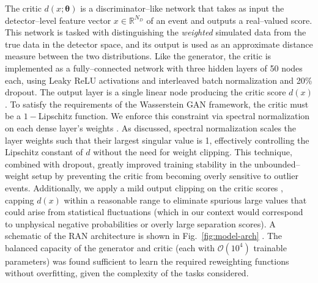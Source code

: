 {{        The critic $d(x;\boldsymbol{\theta})$ is a discriminator--like network that takes as input the {detector--level} feature vector $x \in \mathbb{R}^{N_D}$ of an event and outputs a real--valued score.
        This network is tasked with distinguishing the \textit{weighted} simulated data from the true data in the detector space, and its output is used as an approximate distance measure between the two distributions.
        Like the generator, the critic is implemented as a fully--connected network with three hidden layers of 50 nodes each, using Leaky ReLU activations and interleaved batch normalization and 20\% dropout.
        The output layer is a single linear node producing the critic score $d(x)$.
        To satisfy the requirements of the Wasserstein GAN framework, the critic must be a \(1-\)Lipschitz function.
        We enforce this constraint via {spectral normalization} on each dense layer’s weights .
        As discussed, spectral normalization scales the layer weights such that their largest singular value is 1, effectively controlling the Lipschitz constant of $d$ without the need for weight clipping.
        This technique, combined with dropout, greatly improved training stability in the unbounded--weight setup by preventing the critic from becoming overly sensitive to outlier events.
        Additionally, we apply a mild output clipping on the critic scores , capping $d(x)$ within a reasonable range to eliminate spurious large values that could arise from statistical fluctuations (which in our context would correspond to unphysical negative probabilities or overly large separation scores).
        A schematic of the RAN architecture is shown in Fig.~\ref{fig:model-arch} .
        The balanced capacity of the generator and critic (each with $\mathcal{O}(10^4)$ trainable parameters) was found sufficient to learn the required reweighting functions without overfitting, given the complexity of the tasks considered.

}}
